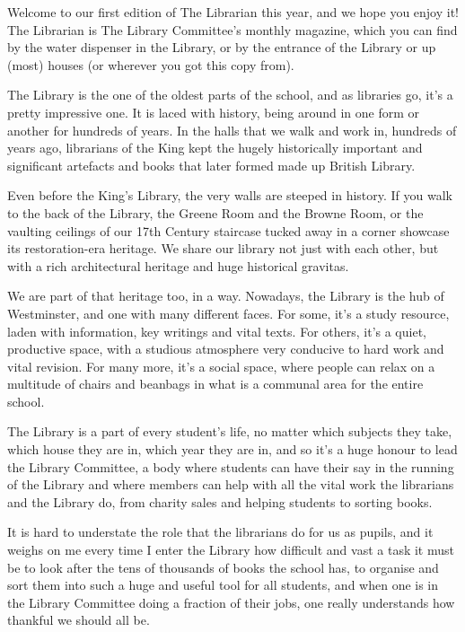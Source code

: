 Welcome to our first edition of The Librarian this year, and we hope you enjoy it! The Librarian is The Library Committee’s monthly magazine, which you can find by the water dispenser in the Library, or by the entrance of the Library or up (most) houses (or wherever you got this copy from).

The Library is the one of the oldest parts of the school, and as libraries go, it’s a pretty impressive one. It is laced with history, being around in one form or another for hundreds of years. In the halls that we walk and work in, hundreds of years ago, librarians of the King kept the hugely historically important and significant artefacts and books that later formed made up British Library.

Even before the King’s Library, the very walls are steeped in history. If you walk to the back of the Library, the Greene Room and the Browne Room, or the vaulting ceilings of our 17th Century staircase tucked away in a corner showcase its restoration-era heritage. We share our library not just with each other, but with a rich architectural heritage and huge historical gravitas.

We are part of that heritage too, in a way. Nowadays, the Library is the hub of Westminster, and one with many different faces. For some, it’s a study resource, laden with information, key writings and vital texts. For others, it’s a quiet, productive space, with a studious atmosphere very conducive to hard work and vital revision. For many more, it’s a social space, where people can relax on a multitude of chairs and beanbags in what is a communal area for the entire school.

The Library is a part of every student’s life, no matter which subjects they take, which house they are in, which year they are in, and so it’s a huge honour to lead the Library Committee, a body where students can have their say in the running of the Library and where members can help with all the vital work the librarians and the Library do, from charity sales and helping students to sorting books.

It is hard to understate the role that the librarians do for us as pupils, and it weighs on me every time I enter the Library how difficult and vast a task it must be to look after the tens of thousands of books the school has, to organise and sort them into such a huge and useful tool for all students, and when one is in the Library Committee doing a fraction of their jobs, one really understands how thankful we should all be.

